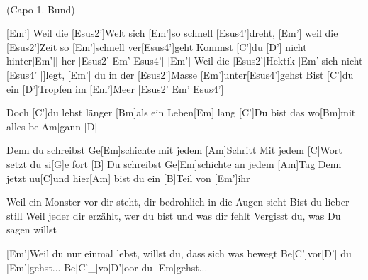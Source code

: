 
\\
{\footnotesize(Capo 1. Bund)}

\begin{guitar}
	[Em'] Weil die [Esus2']Welt sich [Em']so schnell [Esus4']dreht, [Em'] weil die [Esus2']Zeit so [Em']schnell ver[Esus4']geht
	Kommst [C']du [D'] nicht hinter[Em'|]{-}her [Esus2' Em' Esus4']{}
	[Em'] Weil die [Esus2']Hektik [Em']sich nicht [Esus4' |]{legt,  }[Em'] du in der [Esus2']Masse [Em']unter[Esus4']gehst
	Bist [C']du ein [D']Tropfen im [Em']Meer [Esus2' Em' Esus4']{}
	
	Doch [C']du lebst länger [Bm]als ein Leben[Em] lang
	[C']Du bist das wo[Bm]mit alles be[Am]gann [D]{}
	
	Denn du schreibst Ge[Em]schichte mit jedem [Am]Schritt
	Mit jedem [C]Wort setzt du si[G]e fort [B]{}
	Du schreibst Ge[Em]schichte an jedem [Am]Tag
	Denn jetzt uu[C]und hier[Am] bist du ein [B]Teil von [Em']ihr
	
	Weil ein Monster vor dir steht, dir bedrohlich in die Augen sieht
	Bist du lieber still
	Weil jeder dir erzählt, wer du bist und was dir fehlt
	Vergisst du, was Du sagen willst
	
	 
	
	 
	
	[Em']Weil du nur einmal lebst, willst du, dass sich was bewegt
	Be[C']vor[D'] du [Em']gehst...
	Be[C'_]{vo}[D']oor du [Em]gehst...
	
	 
	
	 
\end{guitar}